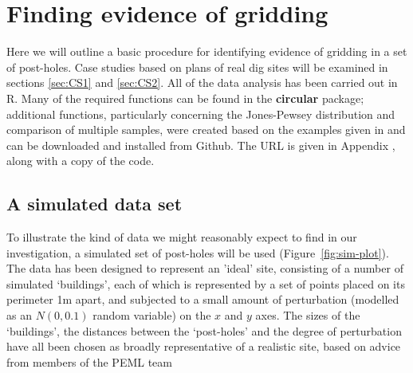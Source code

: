 \documentclass[../../ArchStats.tex]{subfiles}
\begin{document}
\section{Finding evidence of gridding}

Here we will outline a basic procedure for identifying  evidence of gridding in a set of post-holes. Case studies based on plans of real dig sites will be examined in sections \ref{sec:CS1} and \ref{sec:CS2}. All of the data analysis has been carried out in R. Many of the required functions can be found in the \textbf{circular} package; additional functions, particularly concerning the Jones-Pewsey distribution and comparison of multiple samples, were created based on the examples given in \cite{Pewsey2014} and can be downloaded and installed from Github. The URL is given in Appendix , along with a copy of the code.

\subsection{A simulated data set}
To illustrate the kind of data we might reasonably expect to find in our investigation, a simulated set of post-holes will be used (Figure~\ref{fig:sim-plot}). The data has been designed to represent an 'ideal' site, consisting of a number of simulated `buildings', each of which is represented by a set of points placed on its perimeter 1m apart, and subjected to a small amount of perturbation (modelled as an $N(0,0.1)$ random variable) on the $x$ and $y$ axes. The sizes of the `buildings', the distances between the `post-holes' and the degree of perturbation have all been chosen as broadly representative of a realistic site, based on advice from members of the PEML team 


\end{document}
